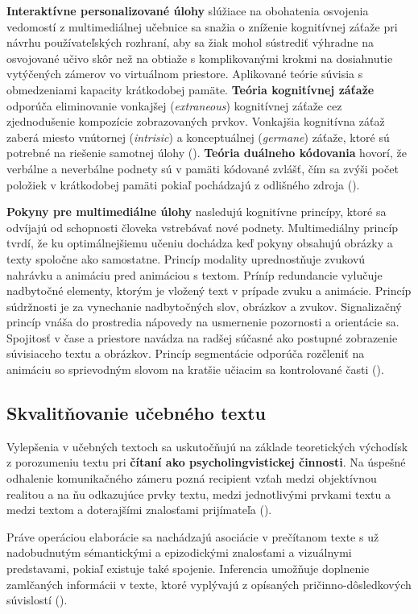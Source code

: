 \textbf{Interaktívne personalizované úlohy} slúžiace na obohatenia osvojenia vedomostí z multimediálnej učebnice sa snažia o zníženie kognitívnej záťaže pri návrhu používateľských rozhraní, aby sa žiak mohol sústrediť výhradne na osvojované učivo skôr než na obtiaže s komplikovanými krokmi na dosiahnutie vytýčených zámerov vo virtuálnom priestore. Aplikované teórie súvisia s obmedzeniami kapacity krátkodobej pamäte. 
\textbf{Teória kognitívnej záťaže} odporúča eliminovanie vonkajšej (\emph{extraneous}) kognitívnej záťaže cez zjednodušenie kompozície zobrazovaných prvkov. Vonkajšia kognitívna záťaž zaberá miesto vnútornej (\emph{intrisic}) a konceptuálnej (\emph{germane}) záťaže, ktoré sú potrebné na riešenie samotnej úlohy (\cite{uhercik_vyznam_2012}). \textbf{Teória duálneho kódovania} hovorí, že verbálne a neverbálne podnety sú v pamäti kódované zvlášť, čím sa zvýši počet položiek v krátkodobej pamäti pokiaľ pochádzajú z odlišného zdroja (\cite{mishra_interactive_2005}). 

\textbf{Pokyny pre multimediálne úlohy} nasledujú kognitívne princípy, ktoré sa odvíjajú od schopnosti človeka vstrebávať nové podnety. Multimediálny princíp tvrdí, že ku optimálnejšiemu učeniu dochádza keď pokyny obsahujú obrázky a texty spoločne ako samostatne. Princíp modality uprednostňuje zvukovú nahrávku a animáciu pred animáciou s textom. Príníp redundancie vylučuje nadbytočné elementy, ktorým je vložený text v prípade zvuku a animácie. Princíp súdržnosti je za vynechanie nadbytočných slov, obrázkov a zvukov. Signalizačný princíp vnáša do prostredia nápovedy na usmernenie pozornosti a orientácie sa. Spojitosť v čase a priestore navádza na radšej súčasné ako postupné zobrazenie súvisiaceho textu a obrázkov. Princíp segmentácie odporúča rozčleniť na animáciu so sprievodným slovom na kratšie učiacim sa kontrolované časti (\cite{mishra_interactive_2005}). 

\subsection{Skvalitňovanie učebného textu}
Vylepšenia v učebných textoch sa uskutočňujú na základe teoretických východísk z porozumeniu textu pri \textbf{čítaní ako psycholingvistickej činnosti}. Na úspešné odhalenie komunikačného zámeru pozná recipient vzťah medzi objektívnou realitou a na ňu odkazujúce prvky textu, medzi jednotlivými prvkami textu a medzi textom a doterajšími znalosťami prijímateľa (\cite{gavora_ziak_1992}). 

Práve operáciou elaborácie sa nachádzajú asociácie v prečítanom texte s už nadobudnutým sémantickými a epizodickými znalosťami a vizuálnymi predstavami, pokiaľ existuje také spojenie. Inferencia umožňuje doplnenie zamlčaných informácii v texte, ktoré vyplývajú z opísaných pričinno-dôsledkových súvislostí (\cite{gavora_ziak_1992}).

